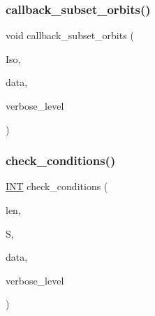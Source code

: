 \mbox{\label{blt__set2_8_c_a4eb3c34c67c16f966bdfa01443c8820a}} 
\subsubsection{\texorpdfstring{callback\+\_\+subset\+\_\+orbits()}{callback\_subset\_orbits()}}
{\footnotesize\ttfamily void callback\+\_\+subset\+\_\+orbits (\begin{DoxyParamCaption}\item[{\mbox{\hyperlink{classisomorph}{isomorph}} $\ast$}]{Iso,  }\item[{void $\ast$}]{data,  }\item[{\mbox{\hyperlink{galois_8h_a09fddde158a3a20bd2dcadb609de11dc}{I\+NT}}}]{verbose\+\_\+level }\end{DoxyParamCaption})}

\mbox{\label{blt__set2_8_c_a923b0fc3a8de3ffb65081770b372075a}} 
\subsubsection{\texorpdfstring{check\+\_\+conditions()}{check\_conditions()}}
{\footnotesize\ttfamily \mbox{\hyperlink{galois_8h_a09fddde158a3a20bd2dcadb609de11dc}{I\+NT}} check\+\_\+conditions (\begin{DoxyParamCaption}\item[{\mbox{\hyperlink{galois_8h_a09fddde158a3a20bd2dcadb609de11dc}{I\+NT}}}]{len,  }\item[{\mbox{\hyperlink{galois_8h_a09fddde158a3a20bd2dcadb609de11dc}{I\+NT}} $\ast$}]{S,  }\item[{void $\ast$}]{data,  }\item[{\mbox{\hyperlink{galois_8h_a09fddde158a3a20bd2dcadb609de11dc}{I\+NT}}}]{verbose\+\_\+level }\end{DoxyParamCaption})}

\mbox{\label{blt__set2_8_c_a87182257b04c108154aaba0054da27bf}} 
